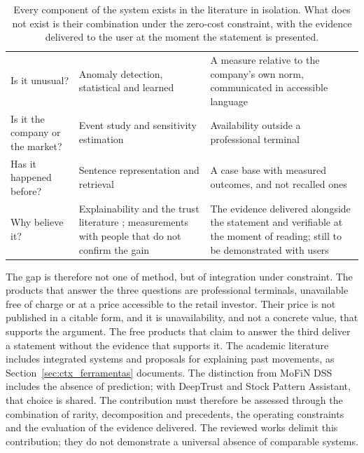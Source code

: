 \begin{table}[!htbp]
\caption[Positioning of the work with respect to the literature]{Every component of the system
exists in the literature in isolation. What does not exist is their combination under the
zero-cost constraint, with the evidence delivered to the user at the moment the statement is
presented.}
\label{tab:ctx_posicionamento}
\centering
\small
\begin{tabular}{L{0.24\textwidth} L{0.30\textwidth} L{0.34\textwidth}}
\toprule
{} &  &  \\
\midrule
Is it unusual?
  & Anomaly detection, statistical and learned \autocite{chandola2009anomaly, liu2008isolation}
  & A measure relative to the company's own norm, communicated in accessible language \\
\addlinespace
Is it the company or the market?
  & Event study and sensitivity estimation \autocite{brown1985daily, vasicek1973beta}
  & Availability outside a professional terminal \\
\addlinespace
Has it happened before?
  & Sentence representation and retrieval \autocite{reimers2019sbert, manning2008ir}
  & A case base with measured outcomes, and not recalled ones \\
\addlinespace
Why believe it?
  & Explainability and the trust literature \autocite{rudin2019stop, lee2004trust}; measurements
    with people that do not confirm the gain \autocite{waa2021xai, cau2023logicstyle,
    bertrand2023featurebased}
  & The evidence delivered alongside the statement and verifiable at the moment of reading;
    still to be demonstrated with users \\
\bottomrule
\end{tabular}
\end{table}

The gap is therefore not one of method, but of integration under constraint. The products that
answer the three questions are professional terminals, unavailable free of charge or at a price
accessible to the retail investor. Their price is not published in a citable form, and it is
unavailability, and not a concrete value, that supports the argument. The free products that claim
to answer the third deliver a statement without the evidence that supports it.
The academic literature includes integrated systems and proposals for explaining past movements,
as Section~\ref{sec:ctx_ferramentas} documents. The distinction from MoFiN DSS includes the absence
of prediction; with DeepTrust and Stock Pattern Assistant, that choice is shared. The contribution
must therefore be assessed through the combination of rarity, decomposition and precedents, the
operating constraints and the evaluation of the evidence delivered. The reviewed works delimit
this contribution; they do not demonstrate a universal absence of comparable systems.

